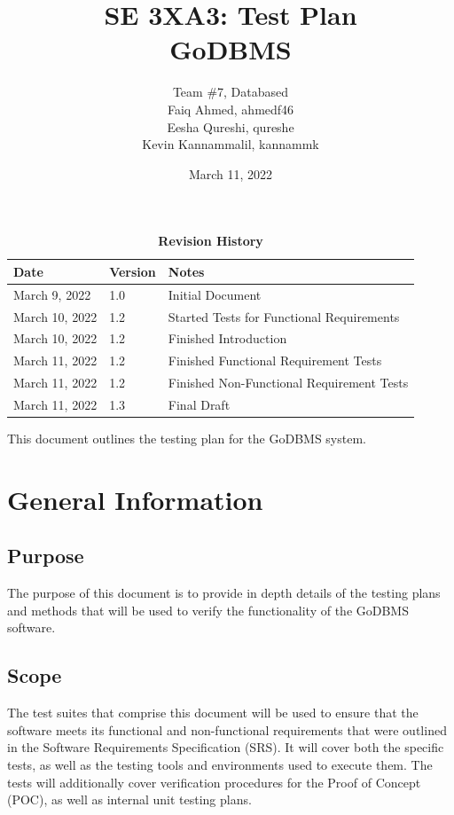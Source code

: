 \documentclass[12pt, titlepage]{article}
\title{SE 3XA3: Test Plan\\GoDBMS}
\author{Team \#7, Databased
		\\ Faiq Ahmed, ahmedf46
		\\ Eesha Qureshi, qureshe
		\\ Kevin Kannammalil, kannammk
}
\date{March 11, 2022}
\begin{document}
\maketitle

\tableofcontents
\listoftables
\listoffigures

\begin{table}[H]
\caption{\bf Revision History}
\begin{tabularx}{\textwidth}{p{3cm}p{2cm}X}
\toprule {\bf Date} & {\bf Version} & {\bf Notes}\\
\midrule
March 9, 2022 & 1.0 & Initial Document \\
March 10, 2022 & 1.2 & Started Tests for Functional Requirements \\
March 10, 2022 & 1.2 & Finished Introduction \\
March 11, 2022 & 1.2 & Finished Functional Requirement Tests \\
March 11, 2022 & 1.2 & Finished Non-Functional Requirement Tests \\
March 11, 2022 & 1.3 & Final Draft \\
\bottomrule
\end{tabularx}
\end{table}

\newpage


This document outlines the testing plan for the GoDBMS system.

\section{General Information}

\subsection{Purpose}
The purpose of this document is to provide in depth details of the testing plans and methods that will be used to verify the functionality of the GoDBMS software.

\subsection{Scope}
The test suites that comprise this document will be used to ensure that the software meets its functional and non-functional requirements that were outlined in the Software Requirements Specification (SRS). It will cover both the specific tests, as well as the testing tools and environments used to execute them. The tests will additionally cover verification procedures for the Proof of Concept (POC), as well as internal unit testing plans.
\end{document}
